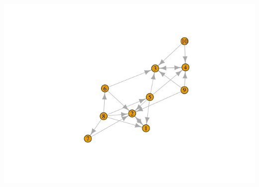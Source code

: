 \documentclass[11pt]{article}
\begin{document}
\begin{center}
\includegraphics[width=.9\linewidth]{ImplementingPageRank/01PageRank_files/figure-html/unnamed-chunk-2-1.png}
\end{center}
\end{document}
